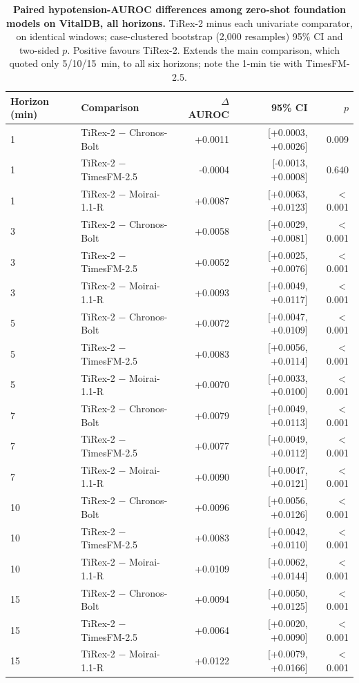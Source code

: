 \begin{table}[ht]
\centering\footnotesize
\caption{\textbf{Paired hypotension-AUROC differences among zero-shot foundation models on VitalDB, all horizons.} TiRex-2 minus each univariate comparator, on identical windows; case-clustered bootstrap (2{,}000 resamples) 95\% CI and two-sided $p$. Positive favours TiRex-2. Extends the main comparison, which quoted only 5/10/15~min, to all six horizons; note the 1-min tie with TimesFM-2.5.}
\label{tab:fm_pairwise}
\begin{tabular}{llrrr}
\toprule
Horizon (min) & Comparison & $\Delta$AUROC & 95\% CI & $p$ \\
\midrule
1 & TiRex-2 $-$ Chronos-Bolt & +0.0011 & [+0.0003, +0.0026] & 0.009 \\
1 & TiRex-2 $-$ TimesFM-2.5 & -0.0004 & [-0.0013, +0.0008] & 0.640 \\
1 & TiRex-2 $-$ Moirai-1.1-R & +0.0087 & [+0.0063, +0.0123] & $<$0.001 \\
3 & TiRex-2 $-$ Chronos-Bolt & +0.0058 & [+0.0029, +0.0081] & $<$0.001 \\
3 & TiRex-2 $-$ TimesFM-2.5 & +0.0052 & [+0.0025, +0.0076] & $<$0.001 \\
3 & TiRex-2 $-$ Moirai-1.1-R & +0.0093 & [+0.0049, +0.0117] & $<$0.001 \\
5 & TiRex-2 $-$ Chronos-Bolt & +0.0072 & [+0.0047, +0.0109] & $<$0.001 \\
5 & TiRex-2 $-$ TimesFM-2.5 & +0.0083 & [+0.0056, +0.0114] & $<$0.001 \\
5 & TiRex-2 $-$ Moirai-1.1-R & +0.0070 & [+0.0033, +0.0100] & $<$0.001 \\
7 & TiRex-2 $-$ Chronos-Bolt & +0.0079 & [+0.0049, +0.0113] & $<$0.001 \\
7 & TiRex-2 $-$ TimesFM-2.5 & +0.0077 & [+0.0049, +0.0112] & $<$0.001 \\
7 & TiRex-2 $-$ Moirai-1.1-R & +0.0090 & [+0.0047, +0.0121] & $<$0.001 \\
10 & TiRex-2 $-$ Chronos-Bolt & +0.0096 & [+0.0056, +0.0126] & $<$0.001 \\
10 & TiRex-2 $-$ TimesFM-2.5 & +0.0083 & [+0.0042, +0.0110] & $<$0.001 \\
10 & TiRex-2 $-$ Moirai-1.1-R & +0.0109 & [+0.0062, +0.0144] & $<$0.001 \\
15 & TiRex-2 $-$ Chronos-Bolt & +0.0094 & [+0.0050, +0.0125] & $<$0.001 \\
15 & TiRex-2 $-$ TimesFM-2.5 & +0.0064 & [+0.0020, +0.0090] & $<$0.001 \\
15 & TiRex-2 $-$ Moirai-1.1-R & +0.0122 & [+0.0079, +0.0166] & $<$0.001 \\
\bottomrule
\end{tabular}
\end{table}

